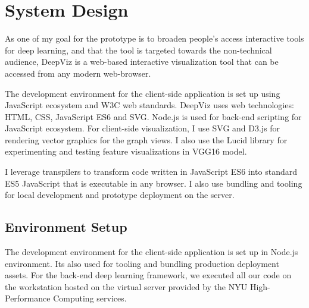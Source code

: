 \section{System Design}

As one of my goal for the prototype is to broaden people’s access interactive tools for deep learning, and that the tool is targeted towards the non-technical audience, DeepViz is a web-based interactive visualization tool that can be accessed from any modern web-browser. 

The development environment for the client-side application is set up using JavaScript ecosystem and W3C web standards. DeepViz uses web technologies: HTML, CSS, JavaScript ES6 and SVG. Node.js is used for back-end scripting for JavaScript ecosystem. For client-side visualization, I use SVG and D3.js for rendering vector graphics for the graph views. I also use the Lucid library for experimenting and testing feature visualizations in VGG16 model.

I leverage transpilers to transform code written in JavaScript ES6 into standard ES5 JavaScript that is executable in any browser. I also use bundling and tooling for local development and prototype deployment on the server.

\subsection{Environment Setup}

The development environment for the client-side application is set up in Node.js environment. Its also used for tooling and bundling production deployment assets. For the back-end deep learning framework, we executed all our code on the workstation hosted on the virtual server provided by the NYU High-Performance Computing services. 

